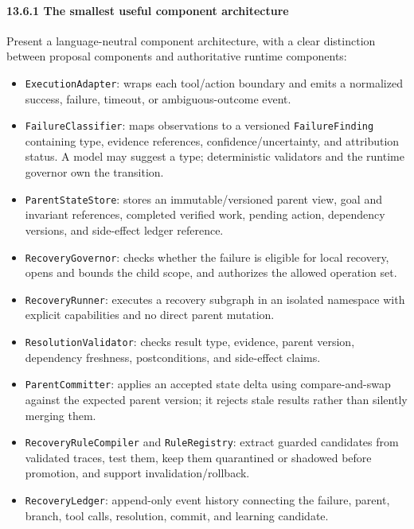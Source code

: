\paragraph{13.6.1 The smallest useful component architecture}\label{1361-the-smallest-useful-component-architecture}

Present a language-neutral component architecture, with a clear distinction between proposal components and authoritative runtime components:

\begin{itemize}
\tightlist
\item
  \texttt{ExecutionAdapter}: wraps each tool/action boundary and emits a normalized success, failure, timeout, or ambiguous-outcome event.
\item
  \texttt{FailureClassifier}: maps observations to a versioned \texttt{FailureFinding} containing type, evidence references, confidence/uncertainty, and attribution status. A model may suggest a type; deterministic validators and the runtime governor own the transition.
\item
  \texttt{ParentStateStore}: stores an immutable/versioned parent view, goal and invariant references, completed verified work, pending action, dependency versions, and side-effect ledger reference.
\item
  \texttt{RecoveryGovernor}: checks whether the failure is eligible for local recovery, opens and bounds the child scope, and authorizes the allowed operation set.
\item
  \texttt{RecoveryRunner}: executes a recovery subgraph in an isolated namespace with explicit capabilities and no direct parent mutation.
\item
  \texttt{ResolutionValidator}: checks result type, evidence, parent version, dependency freshness, postconditions, and side-effect claims.
\item
  \texttt{ParentCommitter}: applies an accepted state delta using compare-and-swap against the expected parent version; it rejects stale results rather than silently merging them.
\item
  \texttt{RecoveryRuleCompiler} and \texttt{RuleRegistry}: extract guarded candidates from validated traces, test them, keep them quarantined or shadowed before promotion, and support invalidation/rollback.
\item
  \texttt{RecoveryLedger}: append-only event history connecting the failure, parent, branch, tool calls, resolution, commit, and learning candidate.
\end{itemize}

